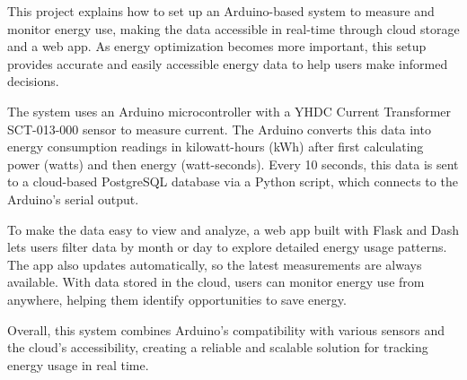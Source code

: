 This project explains how to set up an Arduino-based system to measure and monitor energy use, making the data accessible in real-time through cloud storage and a web app. As energy optimization becomes more important, this setup provides accurate and easily accessible energy data to help users make informed decisions.

The system uses an Arduino microcontroller with a YHDC Current Transformer SCT-013-000 sensor to measure current. The Arduino converts this data into energy consumption readings in kilowatt-hours (kWh) after first calculating power (watts) and then energy (watt-seconds). Every 10 seconds, this data is sent to a cloud-based PostgreSQL database via a Python script, which connects to the Arduino’s serial output.

To make the data easy to view and analyze, a web app built with Flask and Dash lets users filter data by month or day to explore detailed energy usage patterns. The app also updates automatically, so the latest measurements are always available. With data stored in the cloud, users can monitor energy use from anywhere, helping them identify opportunities to save energy.

Overall, this system combines Arduino's compatibility with various sensors and the cloud’s accessibility, creating a reliable and scalable solution for tracking energy usage in real time.
